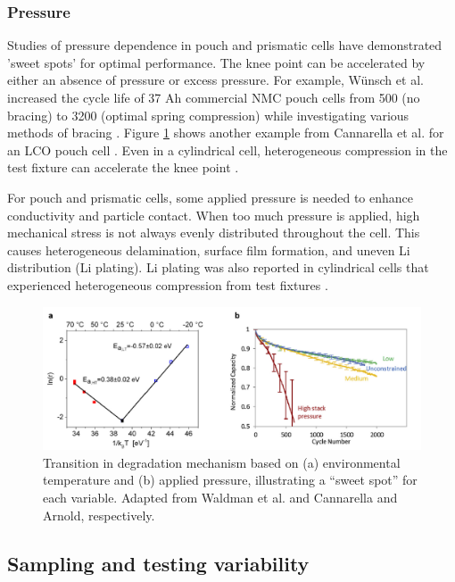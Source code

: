 \documentclass[journal=jpclcd,manuscript=article]{achemso}
\begin{document}
\subsubsection{Pressure}
Studies of pressure dependence in pouch and prismatic cells have demonstrated 'sweet spots' for optimal performance. The knee point can be accelerated by either an absence of pressure or excess pressure. For example, Wünsch et al. increased the cycle life of 37 Ah commercial NMC pouch cells from 500 (no bracing) to 3200 (optimal spring compression) while investigating various methods of bracing \cite{wunsch_investigation_2019}. Figure \ref{fig:temperature_and_pressure} shows another example from Cannarella et al. for an LCO pouch cell \cite{cannarella_stress_2014}. Even in a cylindrical cell, heterogeneous compression in the test fixture can accelerate the knee point \cite{bach_nonlinear_2016}. 

For pouch and prismatic cells, some applied pressure is needed to enhance conductivity and particle contact. When too much pressure is applied, high mechanical stress is not always evenly distributed throughout the cell. This causes heterogeneous delamination, surface film formation, and uneven Li distribution (Li plating). Li plating was also reported in cylindrical cells that experienced heterogeneous compression from test fixtures \cite{bach_nonlinear_2016}. 

\begin{figure}[ht]
\centering
\includegraphics[scale = 0.6]{images/Temperature_and_pressure.png}
\caption{Transition in degradation mechanism based on (a) environmental temperature and (b) applied pressure, illustrating a ``sweet spot'' for each variable. Adapted from Waldman et al.\cite{waldmann_temperature_2014} and Cannarella and Arnold\cite{cannarella_stress_2014}, respectively.}
\label{fig:temperature_and_pressure}
\end{figure}



\subsection{Sampling and testing variability}
\end{document}
